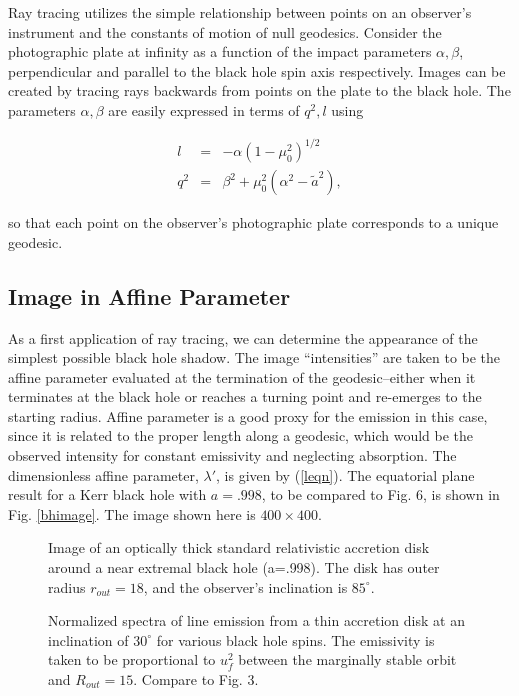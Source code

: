 \documentclass[apj]{emulateapj}
\begin{document}
Ray tracing utilizes the simple relationship between points on an observer's instrument and the constants of motion of null geodesics. Consider the photographic plate at infinity as a function of the impact parameters $\alpha, \beta$, perpendicular and parallel to the black hole spin axis respectively. Images can be created by tracing rays backwards from points on the plate to the black hole. The parameters $\alpha,\beta$ are easily expressed in terms of $q^2,l$ using \citep{cunnbard1973}

\begin{eqnarray}
l &=& -\alpha(1-\mu_0^2)^{1/2} \\
q^2 &=& \beta^2+\mu_0^2(\alpha^2-\tilde{a}^2),
\end{eqnarray}

\noindent so that each point on the observer's photographic plate corresponds to a unique geodesic.

\subsection{Image in Affine Parameter}

As a first application of ray tracing, we can determine the appearance of the simplest possible black hole shadow. The image ``intensities'' are taken to be the affine parameter evaluated at the termination of the geodesic--either when it terminates at the black hole or reaches a turning point and re-emerges to the starting radius. Affine parameter is a good proxy for the emission in this case, since it is related to the proper length along a geodesic, which would be the observed intensity for constant emissivity and neglecting absorption. The dimensionless affine parameter, $\lambda'$, is given by (\ref{leqn}). The equatorial plane result for a Kerr black hole with $a=.998$, to be compared to \citet{bardeen1973} Fig. 6, is shown in Fig. \ref{bhimage}. The image shown here is $400\times400$.

\begin{figure}
\caption{\label{diskimage}Image of an optically thick standard relativistic accretion disk around a near extremal black hole (a=.998). The disk has outer radius $r_{out}=18$, and the observer's inclination is $85^{\circ}$.}
\end{figure}

\begin{figure}
\caption{\label{lines}Normalized spectra of line emission from a thin accretion disk at an inclination of $30^{\circ}$ for various black hole spins. The emissivity is taken to be proportional to $u_f^2$ between the marginally stable orbit and $R_{out}=15$. Compare to \citet{schnittmanbertschinger2004} Fig. 3.}
\end{figure}
\end{document}
